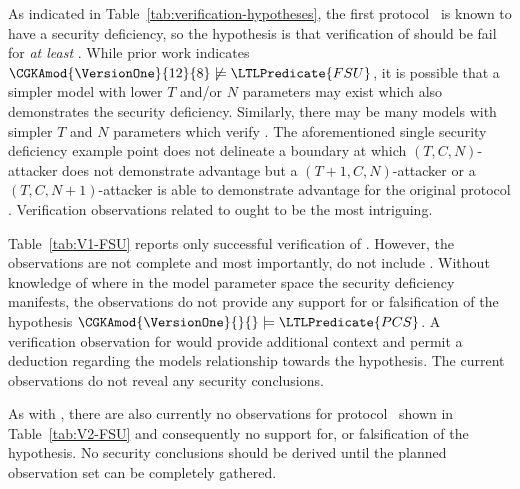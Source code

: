 As indicated in Table\ \ref{tab:verification-hypotheses}, the first protocol \VersionOne\ is known to have a  security deficiency, so the hypothesis is that verification of  should be fail for \emph{at least} .
While prior work \autocite{alwen2020security} indicates \( \CGKAmod{\VersionOne}{12}{8} \not \models \LTLPredicate{FSU} \), it is possible that a simpler model with lower \(T\) and/or \(N\) parameters may exist which also demonstrates the  security deficiency.
Similarly, there may be many  models with simpler \(T\) and \(N\) parameters which verify .
The aforementioned single  security deficiency example point does not delineate a boundary at which \((T, C, N)\)-attacker does not demonstrate advantage but a \((T+1, C, N)\)-attacker or a \((T, C, N+1)\)-attacker is able to demonstrate advantage for the original protocol \VersionOne.
Verification observations related to  ought to be the most intriguing.

Table\ \ref{tab:V1-FSU} reports only successful verification of .
However, the observations are not complete and most importantly, do not include .
Without knowledge of where in the  model parameter space the  security deficiency manifests, the observations do not provide any support for or falsification of the hypothesis \( \CGKAmod{\VersionOne}{}{} \models \LTLPredicate{PCS} \).
A verification observation for  would provide additional context and permit a deduction regarding the models relationship towards the hypothesis.
The current observations do not reveal any security conclusions.

As with , there are also currently no  observations for protocol \VersionTwo\ shown in Table\ \ref{tab:V2-FSU} and consequently no support for, or falsification of the hypothesis.
No security conclusions should be derived until the planned observation set can be completely gathered.

